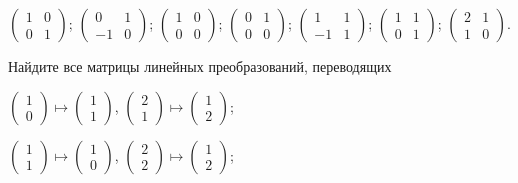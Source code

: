 \documentclass[a4paper,12pt]{article}
\begin{document}
  $\begin{pmatrix} 1 & 0  \\ 0 & 1 \end{pmatrix}$;   $\begin{pmatrix} 0 & 1  \\ -1 & 0 \end{pmatrix}$;   $\begin{pmatrix} 1 & 0  \\ 0 & 0 \end{pmatrix}$;   $\begin{pmatrix} 0 & 1  \\ 0 & 0 \end{pmatrix}$;   $\begin{pmatrix} 1 & 1  \\ -1 & 1 \end{pmatrix}$;   $\begin{pmatrix} 1 & 1  \\ 0 & 1 \end{pmatrix}$;  $\begin{pmatrix} 2 & 1  \\ 1 & 0 \end{pmatrix}$.

	
 Найдите все матрицы линейных преобразований, переводящих

  $\begin{pmatrix} 1 \\ 0 \end{pmatrix} \mapsto \begin{pmatrix} 1 \\ 1 \end{pmatrix}$,  $\begin{pmatrix} 2 \\ 1 \end{pmatrix} \mapsto \begin{pmatrix} 1 \\ 2 \end{pmatrix}$;

  $\begin{pmatrix} 1 \\ 1 \end{pmatrix} \mapsto \begin{pmatrix} 1 \\ 0 \end{pmatrix}$,  $\begin{pmatrix} 2 \\ 2 \end{pmatrix} \mapsto \begin{pmatrix} 1 \\ 2 \end{pmatrix}$;
\end{document}
